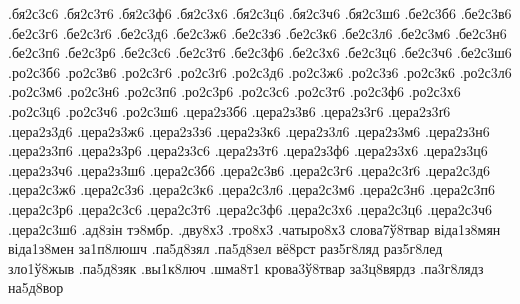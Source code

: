 {.бя2с3с6
.бя2с3т6
.бя2с3ф6
.бя2с3х6
.бя2с3ц6
.бя2с3ч6
.бя2с3ш6
.бе2с3б6
.бе2с3в6
.бе2с3г6
.бе2с3ґ6
.бе2с3д6
.бе2с3ж6
.бе2с3з6
.бе2с3к6
.бе2с3л6
.бе2с3м6
.бе2с3н6
.бе2с3п6
.бе2с3р6
.бе2с3с6
.бе2с3т6
.бе2с3ф6
.бе2с3х6
.бе2с3ц6
.бе2с3ч6
.бе2с3ш6
.ро2с3б6
.ро2с3в6
.ро2с3г6
.ро2с3ґ6
.ро2с3д6
.ро2с3ж6
.ро2с3з6
.ро2с3к6
.ро2с3л6
.ро2с3м6
.ро2с3н6
.ро2с3п6
.ро2с3р6
.ро2с3с6
.ро2с3т6
.ро2с3ф6
.ро2с3х6
.ро2с3ц6
.ро2с3ч6
.ро2с3ш6
.цера2з3б6
.цера2з3в6
.цера2з3г6
.цера2з3ґ6
.цера2з3д6
.цера2з3ж6
.цера2з3з6
.цера2з3к6
.цера2з3л6
.цера2з3м6
.цера2з3н6
.цера2з3п6
.цера2з3р6
.цера2з3с6
.цера2з3т6
.цера2з3ф6
.цера2з3х6
.цера2з3ц6
.цера2з3ч6
.цера2з3ш6
.цера2с3б6
.цера2с3в6
.цера2с3г6
.цера2с3ґ6
.цера2с3д6
.цера2с3ж6
.цера2с3з6
.цера2с3к6
.цера2с3л6
.цера2с3м6
.цера2с3н6
.цера2с3п6
.цера2с3р6
.цера2с3с6
.цера2с3т6
.цера2с3ф6
.цера2с3х6
.цера2с3ц6
.цера2с3ч6
.цера2с3ш6
.ад8зін
тэ8мбр.
.дву8х3
.тро8х3
.чатыро8х3
слова7ў8твар
віда1з8мян
віда1з8мен
за1п8люшч
.па5д8зял
.па5д8зел
вё8рст
раз5г8ляд
раз5г8лед
зло1ў8жыв
.па5д8зяк
.вы1к8люч
.шма8т1
крова3ў8твар
за3ц8вярдз
.па3г8лядз
на5д8вор
}

